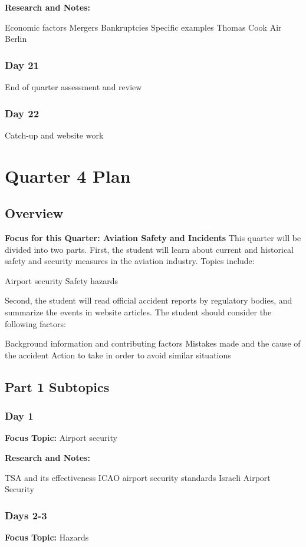 \documentclass[12pt]{article}
\begin{document}
\textbf{Research and Notes:}
\begin{outline}
    \1 Economic factors
\1 Mergers
\1 Bankruptcies
\1 Specific examples
\2 Thomas Cook
\2 Air Berlin
\end{outline}
\subsubsection{Day 21}
End of quarter assessment and review
\subsubsection{Day 22}
Catch-up and website work

\section{Quarter 4 Plan}
\subsection{Overview}
\textbf{Focus for this Quarter: Aviation Safety and Incidents}
This quarter will be divided into two parts. First, the student will learn about current and
historical safety and security measures in the aviation industry. Topics include:
\begin{outline}
    \1 Airport security
\1 Safety hazards
\end{outline}
Second, the student will read official accident reports by regulatory bodies, and summarize
the events in website articles. The student should consider the following factors:
\begin{outline}
    \1 Background information and contributing factors
\1 Mistakes made and the cause of the accident
\1 Action to take in order to avoid similar situations
\end{outline}
\subsection{Part 1 Subtopics}
\subsubsection{Day 1}
\textbf{Focus Topic:} Airport security

\textbf{Research and Notes:}
\begin{outline}
    \1 TSA and its effectiveness
\1 ICAO airport security standards
\1 Israeli Airport Security
\end{outline}
\subsubsection{Days 2-3}
\textbf{Focus Topic:} Hazards
\end{document}
